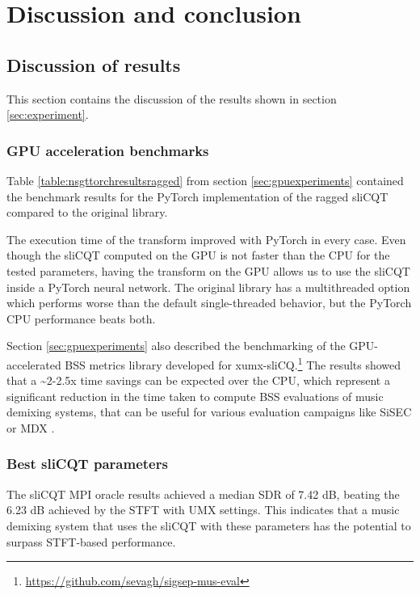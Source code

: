 \documentclass[report.tex]{subfiles}
\begin{document}

\section{Discussion and conclusion}

\subsection{Discussion of results}
\label{sec:discussion}

This section contains the discussion of the results shown in section \ref{sec:experiment}.

\subsubsection{GPU acceleration benchmarks}

Table \ref{table:nsgttorchresultsragged} from section \ref{sec:gpuexperiments} contained the benchmark results for the PyTorch implementation of the ragged sliCQT compared to the original library.

The execution time of the transform improved with PyTorch in every case. Even though the sliCQT computed on the GPU is not faster than the CPU for the tested parameters, having the transform on the GPU allows us to use the sliCQT inside a PyTorch neural network. The original library has a multithreaded option which performs worse than the default single-threaded behavior, but the PyTorch CPU performance beats both.

Section \ref{sec:gpuexperiments} also described the benchmarking of the GPU-accelerated BSS metrics library developed for xumx-sliCQ.\footnote{\url{https://github.com/sevagh/sigsep-mus-eval}} The results showed that a \textasciitilde2-2.5x time savings can be expected over the CPU, which represent a significant reduction in the time taken to compute BSS evaluations of music demixing systems, that can be useful for various evaluation campaigns like SiSEC \parencite{sisec2018} or MDX \parencite{mdx21}.

\subsubsection{Best sliCQT parameters}

The sliCQT MPI oracle results achieved a median SDR of 7.42 dB, beating the 6.23 dB achieved by the STFT with UMX settings. This indicates that a music demixing system that uses the sliCQT with these parameters has the potential to surpass STFT-based performance.
\end{document}
